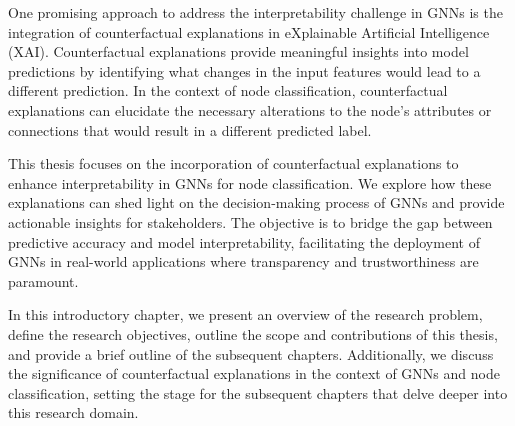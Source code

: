 \documentclass[binding=0.6cm]{sapthesis}
\begin{document}
One promising approach to address the interpretability challenge in GNNs is the integration of counterfactual explanations in eXplainable Artificial Intelligence (XAI\footnotemark). Counterfactual explanations provide meaningful insights into model predictions by identifying what changes in the input features would lead to a different prediction. In the context of node classification, counterfactual explanations can elucidate the necessary alterations to the node's attributes or connections that would result in a different predicted label.



This thesis focuses on the incorporation of counterfactual explanations to enhance interpretability in GNNs for node classification. We explore how these explanations can shed light on the decision-making process of GNNs and provide actionable insights for stakeholders. The objective is to bridge the gap between predictive accuracy and model interpretability, facilitating the deployment of GNNs in real-world applications where transparency and trustworthiness are paramount.


In this introductory chapter, we present an overview of the research problem, define the research objectives, outline the scope and contributions of this thesis, and provide a brief outline of the subsequent chapters. Additionally, we discuss the significance of counterfactual explanations in the context of GNNs and node classification, setting the stage for the subsequent chapters that delve deeper into this research domain.
\end{document}
